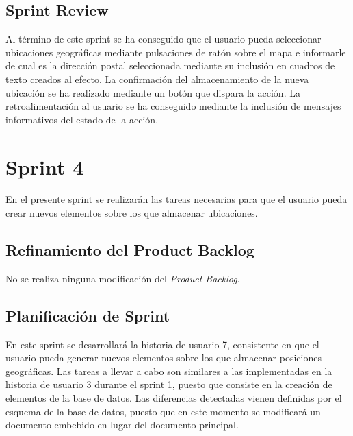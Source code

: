 	\subsection{Sprint Review}
	Al término de este sprint se ha conseguido que el usuario pueda seleccionar ubicaciones geográficas mediante pulsaciones de ratón sobre el mapa e informarle de cual es la dirección postal seleccionada mediante su inclusión en cuadros de texto creados al efecto. La confirmación del almacenamiento de la nueva ubicación se ha realizado mediante un botón que dispara la acción. La retroalimentación al usuario se ha conseguido mediante la inclusión de mensajes informativos del estado de la acción. 

\section{Sprint 4}
	En el presente sprint se realizarán las tareas necesarias para que el usuario pueda crear nuevos elementos sobre los que almacenar ubicaciones.
	
	\subsection{Refinamiento del Product Backlog}
	No se realiza ninguna modificación del \textit{Product Backlog}.
	
	\subsection{Planificación de Sprint}
	En este sprint se desarrollará la historia de usuario 7, consistente en que el usuario pueda generar nuevos elementos sobre los que almacenar posiciones geográficas. Las tareas a llevar a cabo son similares a las implementadas en la historia de usuario 3 durante el sprint 1, puesto que consiste en la creación de elementos de la base de datos. Las diferencias detectadas vienen definidas por el esquema de la base de datos, puesto que en este momento se modificará un documento embebido en lugar del documento principal.
	
